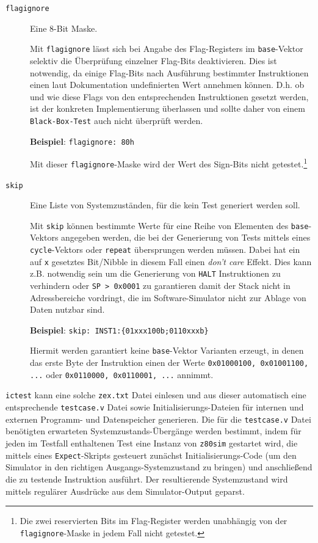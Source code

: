 \documentclass[ngerman, cd=lightcolor]{tudscrreprt}
\begin{document}
\begin{description}
\item[\texttt{flagignore}] Eine 8-Bit Maske.

Mit \texttt{flagignore} lässt sich bei Angabe des Flag-Registers im
\texttt{base}-Vektor selektiv die Überprüfung einzelner Flag-Bits deaktivieren.
Dies ist notwendig, da einige Flag-Bits nach Ausführung bestimmter Instruktionen
einen laut Dokumentation undefinierten Wert annehmen können. D.h. ob und wie
diese Flags von den entsprechenden Instruktionen gesetzt werden, ist der
konkreten Implementierung überlassen und sollte daher von einem
\texttt{Black-Box-Test} auch nicht überprüft werden.

\textbf{Beispiel}: \texttt{flagignore: 80h}

Mit dieser \texttt{flagignore}-Maske wird der Wert des Sign-Bits nicht
getestet.\footnote{Die zwei reservierten Bits im Flag-Register werden
unabhängig von der \texttt{flagignore}-Maske in jedem Fall nicht getestet.}

\item[\texttt{skip}] Eine Liste von Systemzuständen, für die kein Test generiert
werden soll.

Mit \texttt{skip} können bestimmte Werte für eine Reihe von Elementen des
\texttt{base}-Vektors angegeben werden, die bei der Generierung von Tests
mittels eines \texttt{cycle}-Vektors oder \texttt{repeat} übersprungen werden
müssen. Dabei hat ein auf \texttt{x} gesetztes Bit/Nibble in diesem Fall einen
\textit{don't care} Effekt. Dies kann z.B. notwendig sein um die Generierung von
\texttt{HALT} Instruktionen zu verhindern oder \texttt{SP > 0x0001} zu
garantieren damit der Stack nicht in Adressbereiche vordringt, die im
Software-Simulator nicht zur Ablage von Daten nutzbar sind.

\textbf{Beispiel}: \texttt{skip: INST1:\{01xxx100b;0110xxxb\}}

Hiermit werden garantiert keine \texttt{base}-Vektor Varianten erzeugt, in
denen das erste Byte der Instruktion einen der Werte \texttt{0x01000100,
0x01001100, ...} oder \texttt{0x0110000, 0x0110001, ...} annimmt.
\end{description}

\noindent
\texttt{ictest} kann eine solche \texttt{zex.txt} Datei einlesen und aus dieser
automatisch eine entsprechende \texttt{testcase.v} Datei sowie
Initialisierungs-Dateien für internen und externen Programm- und Datenspeicher
generieren. Die für die \texttt{testcase.v} Datei benötigten erwarteten
Systemzustands-Übergänge werden bestimmt, indem für jeden im Testfall
enthaltenen Test eine Instanz von \texttt{z80sim} gestartet wird, die mittels
eines \texttt{Expect}-Skripts gesteuert zunächst Initialisierungs-Code (um den
Simulator in den richtigen Ausgangs-Systemzustand zu bringen) und anschließend
die zu testende Instruktion ausführt. Der resultierende Systemzustand wird
mittels regulärer Ausdrücke aus dem Simulator-Output geparst.
\end{document}
